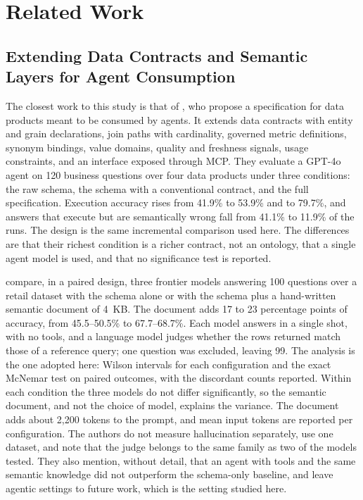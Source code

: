 \chapter{Related Work}

\section{Extending Data Contracts and Semantic Layers for Agent Consumption}
The closest work to this study is that of , who propose a
specification for data products meant to be consumed by agents. It extends data contracts
with entity and grain declarations, join paths with cardinality, governed metric
definitions, synonym bindings, value domains, quality and freshness signals, usage
constraints, and an interface exposed through MCP. They evaluate a GPT-4o agent on 120
business questions over four data products under three conditions: the raw schema, the
schema with a conventional contract, and the full specification. Execution accuracy rises
from 41.9\% to 53.9\% and to 79.7\%, and answers that execute but are semantically wrong
fall from 41.1\% to 11.9\% of the runs. The design is the same incremental comparison used
here. The differences are that their richest condition is a richer contract, not an
ontology, that a single agent model is used, and that no significance test is reported.

 compare, in a paired design, three frontier models
answering 100 questions over a retail dataset with the schema alone or with the schema plus
a hand-written semantic document of 4~KB. The document adds 17 to 23 percentage points of
accuracy, from 45.5--50.5\% to 67.7--68.7\%. Each model answers in a single shot, with no
tools, and a language model judges whether the rows returned match those of a reference
query; one question was excluded, leaving 99. The analysis is the one adopted here: Wilson
intervals for each configuration and the exact McNemar test on paired outcomes, with the
discordant counts reported. Within each condition the three models do not differ
significantly, so the semantic document, and not the choice of model, explains the variance.
The document adds about 2{,}200 tokens to the prompt, and mean input tokens are reported per
configuration. The authors do not measure hallucination separately, use one dataset, and
note that the judge belongs to the same family as two of the models tested. They also
mention, without detail, that an agent with tools and the same semantic knowledge did not
outperform the schema-only baseline, and leave agentic settings to future work, which is the
setting studied here.

